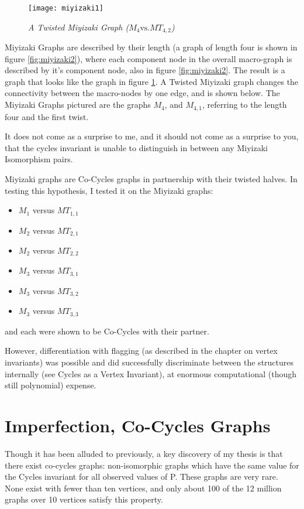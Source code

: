 \begin{figure}[h]
\caption{\emph{A Twisted Miyizaki Graph ($M_4 \text{vs.} MT_{4,2}$)}}
\centering
\texttt{[image: miyizaki1]}
\label{fig:miyizaki1}
\end{figure}

Miyizaki Graphs are described by their length (a graph of length four is shown in figure \ref{fig:miyizaki2}), where each component node in the overall macro-graph is described by it's component node, also in figure \ref{fig:miyizaki2}.
The result is a graph that looks like the graph in figure \ref{fig:miyizaki1}.
A Twisted Miyizaki graph changes the connectivity between the macro-nodes by one edge, and is shown below.
The Miyizaki Graphs pictured are the graphs  $M_4$, and $M_{4, 1}$, referring to the length four and the first twist.

It does not come as a surprise to me, and it should not come as a surprise to you, that the cycles invariant is unable to distinguish in between any Miyizaki Isomorphism pairs.

Miyizaki graphs are Co-Cycles graphs in partnership with their twisted halves.
In testing this hypothesis, I tested it on the Miyizaki graphs:
\begin{itemize}
\item{$M_1$ versus $MT_{1,1}$}
\item{$M_2$ versus $MT_{2,1}$}
\item{$M_2$ versus $MT_{2,2}$}
\item{$M_3$ versus $MT_{3,1}$}
\item{$M_3$ versus $MT_{3,2}$}
\item{$M_3$ versus $MT_{3,3}$}
\end{itemize}
and each were shown to be Co-Cycles with their partner.

However, differentiation with flagging (as described in the chapter on vertex invariants) was possible and did successfully discriminate between the structures internally (see Cycles as a Vertex Invariant), at enormous computational (though still polynomial) expense.

\section{Imperfection, Co-Cycles Graphs}

Though it has been alluded to previously, a key discovery of my thesis is that there exist co-cycles graphs: non-isomorphic graphs which have the same value for the Cycles invariant for all observed values of P.
These graphs are very rare.
None exist with fewer than ten vertices, and only about 100 of the 12 million graphs over 10 vertices satisfy this property.

